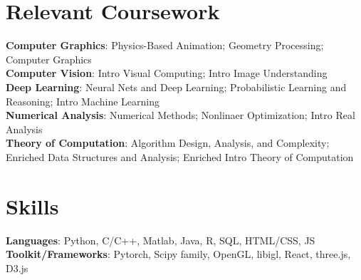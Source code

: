 \documentclass[letterpaper,11pt]{article}
\makeatletter
\newcommand{\resumeItem}[1]{
  \item\small{
    {#1 \vspace{-2pt}}
  }
}
\newcommand{\resumeSubheading}[4]{
  \vspace{-2pt}\item
    \begin{tabular*}{1.0\textwidth}[t]{l@{\extracolsep{\fill}}r}
      \textbf{#1} & \textbf{\small #2} \\
      \textit{\small#3} & {\small #4} \\
    \end{tabular*}\vspace{-7pt}
}
\newcommand{\resumeSubHeadingListStart}{\begin{itemize}[leftmargin=0.0in, label={}]}
\newcommand{\resumeSubHeadingListEnd}{\end{itemize}}
\newcommand{\resumeItemListStart}{\begin{itemize}}
\newcommand{\resumeItemListEnd}{\end{itemize}\vspace{-5pt}}
\makeatother
\begin{document}
\section{Relevant Coursework}
 \begin{itemize}[leftmargin=0.15in, label={}]
    \small{\item{
     \textbf{Computer Graphics}{: Physics-Based Animation; Geometry Processing; Computer Graphics} \\
     \vspace{2pt}  
     \textbf{Computer Vision}{: Intro Visual Computing; Intro Image Understanding} \\
     \vspace{2pt}  
     \textbf{Deep Learning}{: Neural Nets and Deep Learning; Probabilistic Learning and Reasoning; Intro Machine Learning} \\
     \vspace{2pt}  
     \textbf{Numerical Analysis}{: Numerical Methods; Nonlinaer Optimization; Intro Real Analysis}\\
     \vspace{2pt}  
     \textbf{Theory of Computation}{: Algorithm Design, Analysis, and Complexity; Enriched Data Structures and Analysis; Enriched Intro Theory of Computation}
    }}
 \end{itemize}
 



%
\section{Skills}
 \begin{itemize}[leftmargin=0.15in, label={}]
    \small{\item{
     \textbf{Languages}{: Python,  C/C++, Matlab, Java, R, SQL, HTML/CSS, JS} \\
     \textbf{Toolkit/Frameworks}{: Pytorch, Scipy family, OpenGL, libigl, React, three.js, D3.js}
    }}
 \end{itemize}


        
\end{document}
